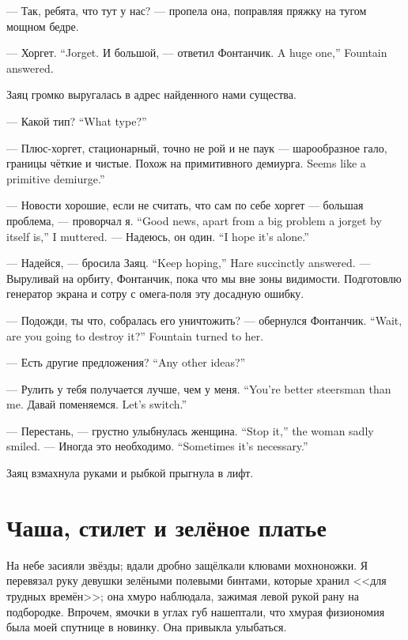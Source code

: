 --- Так, ребята, что тут у нас? --- пропела она, поправляя пряжку на тугом мощном бедре.

{--- Хоргет.}
{``Jorget.}
{И большой, --- ответил Фонтанчик.}
{A huge one,'' Fountain answered.}

Заяц громко выругалась в адрес найденного нами существа.

{--- Какой тип?}
{``What type?''}

--- Плюс-хоргет, стационарный, точно не рой и не паук --- шарообразное гало, границы чёткие и чистые.
{Похож на примитивного демиурга.}
{Seems like a primitive demiurge.''}

{--- Новости хорошие, если не считать, что сам по себе хоргет --- большая проблема, --- проворчал я.}
{``Good news, apart from a big problem a jorget by itself is,'' I muttered.}
{--- Надеюсь, он один.}
{``I hope it's alone.''}

{--- Надейся, --- бросила Заяц.}
{``Keep hoping,'' Hare succinctly answered.}
--- Выруливай на орбиту, Фонтанчик, пока что мы вне зоны видимости.
Подготовлю генератор экрана и сотру с омега-поля эту досадную ошибку.

{--- Подожди, ты что, собралась его уничтожить? --- обернулся Фонтанчик.}
{``Wait, are you going to destroy it?'' Fountain turned to her.}

{--- Есть другие предложения?}
{``Any other ideas?''}

{--- Рулить у тебя получается лучше, чем у меня.}
{``You're better steersman than me.}
{Давай поменяемся.}
{Let's switch.''}

{--- Перестань, --- грустно улыбнулась женщина.}
{``Stop it,'' the woman sadly smiled.}
{--- Иногда это необходимо.}
{``Sometimes it's necessary.''}

Заяц взмахнула руками и рыбкой прыгнула в лифт.

\section{Чаша, стилет и зелёное платье}

На небе засияли звёзды;
вдали дробно защёлкали клювами мохноножки.
Я перевязал руку девушки зелёными полевыми бинтами, которые хранил <<для трудных времён>>;
она хмуро наблюдала, зажимая левой рукой рану на подбородке.
Впрочем, ямочки в углах губ нашептали, что хмурая физиономия была моей спутнице в новинку.
Она привыкла улыбаться.

